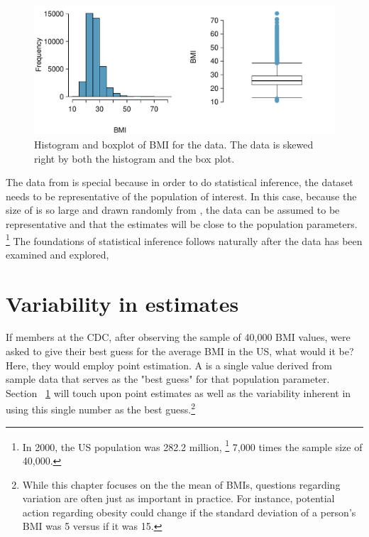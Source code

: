 \begin{figure}
\centering
\includegraphics[width =  \textwidth]{ch_inference_foundations_oi_biostat/figures/brfssBMIsampHistograms/brfssBMIsampHistograms}
\caption{Histogram and boxplot of BMI for the  data. The data is skewed right by both the histogram and the box plot.}
\label{exploreBMI}
\end{figure}

The data from  is special because in order to do statistical inference, the dataset needs to be representative of the population of interest. In this case, because the size of  is so large and drawn randomly from , the data can be assumed to be representative and that the estimates will be close to the population parameters. \footnote{In 2000, the US population was 282.2 million, \footnote{\url{http://www.census.gov/prod/2002pubs/c2kprof00-us.pdf}} 7,000 times the sample size of 40,000.} The foundations of statistical inference follows naturally after the data has been examined and explored, 

\section{Variability in estimates}
\label{variabilityInEstimates}


If members at the CDC, after observing the sample of 40,000 BMI values, were asked to give their best guess for the average BMI in the US, what would it be? Here, they would employ point estimation. A  is a single value derived from sample data that serves as the "best guess" for that population parameter. Section ~\ref{variabilityInEstimates} will touch upon point estimates as well as the variability inherent in using this single number as the best guess.\footnote{While this chapter focuses on the the mean of BMIs, questions regarding variation are often just as important in practice. For instance, potential action regarding obesity could change if the standard deviation of a person's BMI was 5 versus if it was 15.} 

